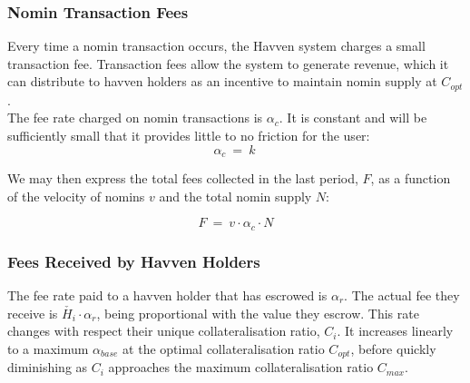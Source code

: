 \subsubsection{Nomin Transaction Fees}
Every time a nomin transaction occurs, the Havven system charges a small transaction fee.
Transaction fees allow the system to generate revenue, which it can distribute to havven holders
as an incentive to maintain nomin supply at $C_{opt}$. \\

\noindent The fee rate charged on nomin transactions is $\alpha_c$. It is constant and will be
sufficiently small that it provides little to no friction for the user: \\

\begin{equation}
\alpha_c \ = \ k \ \label{eq:5}
\end{equation}

\begin{center}
\end{center}

\noindent We may then express the total fees collected in the last period, $F$, as a function
of the velocity of nomins $v$ and the total nomin supply $N$:

\begin{equation}
    F \ = \ v \cdot \alpha_c \cdot N
\end{equation}

\newpage
\subsubsection{Fees Received by Havven Holders}

\noindent The fee rate paid to a havven holder that has escrowed is $\alpha_r$.
The actual fee they receive is $\check{H_i} \cdot \alpha_r$, being proportional with the value they escrow.
This rate changes with respect their unique collateralisation ratio, $C_i$. It increases linearly to a maximum $\alpha_{base}$ at the optimal collateralisation ratio $C_{opt}$, before quickly
diminishing as $C_i$ approaches the maximum collateralisation ratio $C_{max}$.  \\

